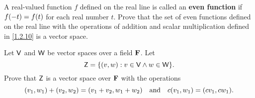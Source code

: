 \begin{ex}\label{ex:1.2.12}
    A real-valued function \(f\) defined on the real line is called an \textbf{even function} if \(f\p{-t} = f\p{t}\) for each real number \(t\).
    Prove that the set of even functions defined on the real line with the operations of addition and scalar multiplication defined in \cref{1.2.10} is a vector space.
\end{ex}

\setcounter{ex}{20}
\begin{ex}\label{ex:1.2.21}
    Let \(\mathsf{V}\) and \(\mathsf{W}\) be vector spaces over a field \(\mathbf{F}\).
    Let
    \[
        \vs{Z} = \set{\p{v, w} : v \in \V \land w \in \W}.
    \]
    Prove that \(\mathsf{Z}\) is a vector space over \(\mathbf{F}\) with the operations
    \[
        \p{v_1, w_1} + \p{v_2, w_2} = \p{v_1 + v_2, w_1 + w_2} \quad \text{and} \quad c\p{v_1, w_1} = \p{cv_1, cw_1}.
    \]
\end{ex}
